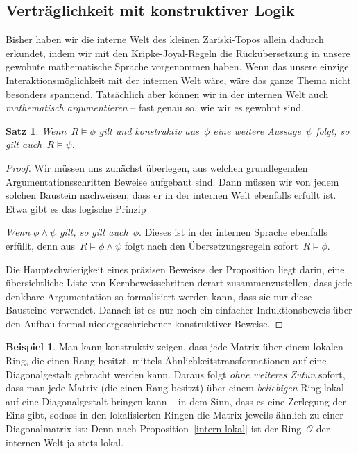\documentclass[a4paper,ngerman,12pt]{scrartcl}
\theoremstyle{definition}
\newtheorem{bsp}[defn]{Beispiel}
\theoremstyle{plain}
\newtheorem{satz}[defn]{Satz}
\theoremstyle{remark}
\renewcommand{\O}{\mathcal{O}}
\renewcommand{\_}{\mathpunct{.}\,}
\newcommand{\?}{\,{:}\,}
\newenvironment{indentblock}{%
  \list{}{\leftmargin\leftmargin}%
  \item\relax
}{%
  \endlist
}
\begin{document}
\subsection{Verträglichkeit mit konstruktiver Logik}

Bisher haben wir die interne Welt des kleinen Zariski-Topos allein dadurch
erkundet, indem wir mit den Kripke-Joyal-Regeln die Rückübersetzung in unsere
gewohnte mathematische Sprache vorgenommen haben. Wenn das unsere einzige
Interaktionsmöglichkeit mit der internen Welt wäre, wäre das ganze Thema nicht
besonders spannend. Tatsächlich aber können wir in der internen Welt auch
\emph{mathematisch argumentieren} -- fast genau so, wie wir es gewohnt sind.

\begin{satz}\label{soundness}%
Wenn~$R \models \phi$ gilt und konstruktiv aus~$\phi$ eine weitere
Aussage~$\psi$ folgt, so gilt auch~$R \models \psi$.\end{satz}
\begin{proof}Wir müssen uns
zunächst überlegen, aus welchen grundlegenden Argumentationsschritten Beweise
aufgebaut sind. Dann müssen wir von jedem solchen Baustein nachweisen,
dass er in der internen Welt ebenfalls erfüllt ist. Etwa gibt es das logische
Prinzip
\begin{indentblock}\emph{Wenn $\phi \wedge \psi$ gilt, so gilt auch~$\phi$}.
\end{indentblock}
Dieses ist in der internen Sprache ebenfalls erfüllt, denn aus~$R \models \phi
\wedge \psi$ folgt nach den Übersetzungsregeln sofort~$R \models \phi$.

Die Hauptschwierigkeit eines präzisen Beweises der Proposition liegt darin,
eine über\-sicht\-li\-che Liste von Kernbeweisschritten derart zusammenzustellen,
dass jede denkbare Argumentation so formalisiert werden kann, dass sie nur diese
Bausteine verwendet. Danach ist es nur noch ein einfacher Induktionsbeweis über den
Aufbau formal niedergeschriebener konstruktiver Beweise.
\end{proof}

\begin{bsp}Man kann konstruktiv zeigen, dass jede Matrix über einem lokalen
Ring, die einen Rang besitzt, mittels Ähnlichkeitstransformationen auf eine
Diagonalgestalt gebracht werden kann. Daraus folgt \emph{ohne weiteres Zutun}
sofort, dass man jede Matrix (die einen Rang besitzt) über einem
\emph{beliebigen} Ring lokal auf eine Diagonalgestalt bringen kann -- in dem Sinn, dass es
eine Zerlegung der Eins gibt, sodass in den lokalisierten Ringen die Matrix
jeweils ähnlich zu einer Diagonalmatrix ist: Denn nach Proposition~\ref{intern-lokal}
ist der Ring~$\O$ der internen Welt ja stets lokal.\end{bsp}
\end{document}
